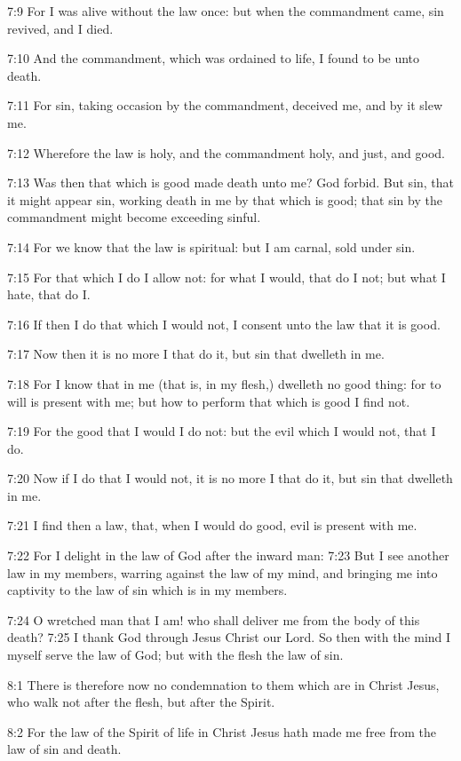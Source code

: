 7:9 For I was alive without the law once: but when the commandment came, sin revived, and I died.

7:10 And the commandment, which was ordained to life, I found to be unto death.

7:11 For sin, taking occasion by the commandment, deceived me, and by it slew me.

7:12 Wherefore the law is holy, and the commandment holy, and just, and good.

7:13 Was then that which is good made death unto me? God forbid. But sin, that it might appear sin, working death in me by that which is good; that sin by the commandment might become exceeding sinful.

7:14 For we know that the law is spiritual: but I am carnal, sold under sin.

7:15 For that which I do I allow not: for what I would, that do I not; but what I hate, that do I.

7:16 If then I do that which I would not, I consent unto the law that it is good.

7:17 Now then it is no more I that do it, but sin that dwelleth in me.

7:18 For I know that in me (that is, in my flesh,) dwelleth no good thing: for to will is present with me; but how to perform that which is good I find not.

7:19 For the good that I would I do not: but the evil which I would not, that I do.

7:20 Now if I do that I would not, it is no more I that do it, but sin that dwelleth in me.

7:21 I find then a law, that, when I would do good, evil is present with me.

7:22 For I delight in the law of God after the inward man: 7:23 But I see another law in my members, warring against the law of my mind, and bringing me into captivity to the law of sin which is in my members.

7:24 O wretched man that I am! who shall deliver me from the body of this death?  7:25 I thank God through Jesus Christ our Lord. So then with the mind I myself serve the law of God; but with the flesh the law of sin.

8:1 There is therefore now no condemnation to them which are in Christ Jesus, who walk not after the flesh, but after the Spirit.

8:2 For the law of the Spirit of life in Christ Jesus hath made me free from the law of sin and death.

